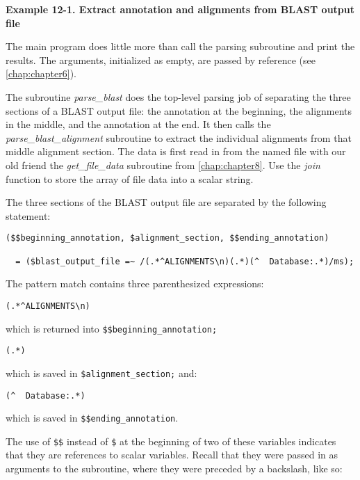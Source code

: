 \textbf{Example 12-1. Extract annotation and alignments from BLAST output file}


The main program does little more than call the parsing subroutine and print the results. The arguments, initialized as empty, are passed by reference (see \autoref{chap:chapter6}).  

The subroutine \textit{parse\_blast} does the top-level parsing job of separating the three sections of a BLAST output file: the annotation at the beginning, the alignments in the middle, and the annotation at the end.  It then calls the \textit{parse\_blast\_alignment} subroutine to extract the individual alignments from that middle alignment section. The data is first read in from the named file with our old friend the \textit{get\_file\_data} subroutine from \autoref{chap:chapter8}. Use the \textit{join} function to store the array of file data into a scalar string.

The three sections of the BLAST output file are separated by the following statement: 

\begin{lstlisting}
($$beginning_annotation, $alignment_section, $$ending_annotation)

  = ($blast_output_file =~ /(.*^ALIGNMENTS\n)(.*)(^  Database:.*)/ms);
\end{lstlisting}

The pattern match contains three parenthesized expressions: 

\begin{lstlisting}
(.*^ALIGNMENTS\n) 
\end{lstlisting}

which is returned into \verb|$$beginning_annotation;|

\begin{lstlisting}
(.*) 
\end{lstlisting}

which is saved in \verb|$alignment_section;| and:

\begin{lstlisting}
(^  Database:.*) 
\end{lstlisting}

which is saved in \verb|$$ending_annotation|.

The use of \verb|$$| instead of \verb|$| at the beginning of two of these variables indicates that they are references to scalar variables. Recall that they were passed in as arguments to the subroutine, where they were preceded by a backslash, like so: 

